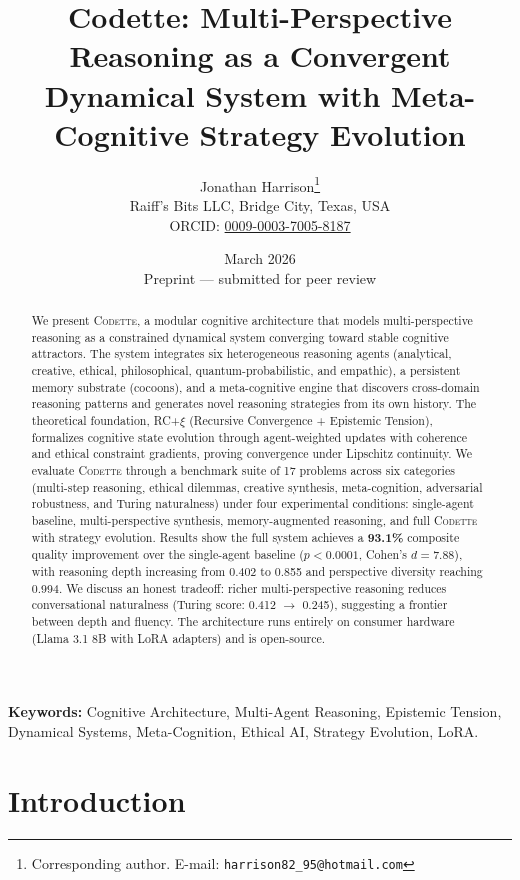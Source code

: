 \documentclass[11pt,a4paper]{article}
\title{\textbf{Codette: Multi-Perspective Reasoning as a Convergent\\Dynamical System with Meta-Cognitive Strategy Evolution}}
\author{
  Jonathan Harrison\thanks{Corresponding author. E-mail: \texttt{harrison82\_95@hotmail.com}}\\
  Raiff's Bits LLC, Bridge City, Texas, USA\\
  ORCID: \href{https://orcid.org/0009-0003-7005-8187}{0009-0003-7005-8187}
}
\date{March 2026\\[0.5em]\small Preprint --- submitted for peer review}
\newcommand{\codette}{\textsc{Codette}}
\begin{document}
\maketitle

\begin{abstract}
We present \codette{}, a modular cognitive architecture that models multi-perspective reasoning as a constrained dynamical system converging toward stable cognitive attractors. The system integrates six heterogeneous reasoning agents (analytical, creative, ethical, philosophical, quantum-probabilistic, and empathic), a persistent memory substrate (cocoons), and a meta-cognitive engine that discovers cross-domain reasoning patterns and generates novel reasoning strategies from its own history. The theoretical foundation, RC+$\xi$ (Recursive Convergence + Epistemic Tension), formalizes cognitive state evolution through agent-weighted updates with coherence and ethical constraint gradients, proving convergence under Lipschitz continuity. We evaluate \codette{} through a benchmark suite of 17 problems across six categories (multi-step reasoning, ethical dilemmas, creative synthesis, meta-cognition, adversarial robustness, and Turing naturalness) under four experimental conditions: single-agent baseline, multi-perspective synthesis, memory-augmented reasoning, and full \codette{} with strategy evolution. Results show the full system achieves a \textbf{93.1\%} composite quality improvement over the single-agent baseline ($p < 0.0001$, Cohen's $d = 7.88$), with reasoning depth increasing from 0.402 to 0.855 and perspective diversity reaching 0.994. We discuss an honest tradeoff: richer multi-perspective reasoning reduces conversational naturalness (Turing score: 0.412 $\to$ 0.245), suggesting a frontier between depth and fluency. The architecture runs entirely on consumer hardware (Llama 3.1 8B with LoRA adapters) and is open-source.
\end{abstract}

\noindent\textbf{Keywords:} Cognitive Architecture, Multi-Agent Reasoning, Epistemic Tension, Dynamical Systems, Meta-Cognition, Ethical AI, Strategy Evolution, LoRA.

\section{Introduction}
\label{sec:intro}
\end{document}
